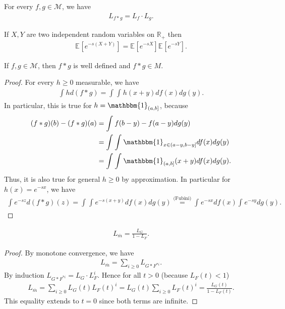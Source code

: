 \begin{prop}[]
	For every $f,g\in \mathcal{M}$, we have
	\begin{align}
		L_{f*g} = L_f \cdot L_g.
	\end{align}
\end{prop}
\begin{rmk}[]
	If $X,Y$ are two independent random variables on $\mathbb{R}_+$ then
	\begin{align}
		\mathbb{E}_{} \left[ e^{-s(X+Y)} \right] =\mathbb{E}_{} \left[ e^{-sX} \right] \mathbb{E}_{} \left[ e^{-sY} \right]. 
	\end{align}
\end{rmk}
\begin{rmk}[]
	If $f,g \in \mathcal{M}$, then $f*g$ is well defined and $f*g \in M$.
\end{rmk}
\begin{proof}
For every $h\geq 0$ measurable, we have
\begin{align}
	\int_{}^{}  h d(f*g) = \int_{}^{} \int_{}^{} h(x+y)df(x) dg(y).
\end{align}
{\color{blue} In particular, this is} true for $h=\mathbbm{1}_{(a,b]} $, because
\begin{align}
	(f*g)(b) - (f*g)(a) &= \int_{}^{} f(b-y) - f(a-y) dg(y) \\
			    &=\int_{}^{} \int_{ }^{} \mathbbm{1}_{x \in (a-y, b-y]} df(x)dg(y) \\
			    &= \int_{}^{} \int_{}^{} \mathbbm{1}_{(a,b]} (x+y) df(x)dg(y).
\end{align}
Thus, it is also true for general $h\geq 0$ by approximation. In particular for $h(x) = e^{-sx}$, we have 
\begin{align}
	\int_{}^{} e^{-sz} d(f*g)(z) = \int_{}^{} \int_{}^{} e^{-s(x+y)} df(x)dg(y) \stackrel{\textrm{(Fubini)}}{=} 
	\int_{}^{} e^{-sx}df(x) \int_{}^{} e^{-sy}dg(y).
\end{align}
\end{proof}

\begin{cor}[]
	\begin{align}
		L_{\overline{m}} = \frac{L_G}{1-L_F}.
	\end{align}
\end{cor}
\begin{proof}
	By monotone convergence, we have
	\begin{align}
		L_{\overline{m}} = \sum_{i\geq 0}^{} L_{G*F^{*i}}.
	\end{align}
	By induction $L_{G*F^{*i}}= L_{G}\cdot L_{F}^i$. Hence for all $t> 0$ (because $L_F(t) <1$) 
	\begin{align}
		L_{\overline{m}} = \sum_{i\geq 0}^{} L_{G}(t) L_{F}(t)^{i} = L_{G}(t) \sum_{i\geq 0}^{} L_{F}(t)^i= \frac{L_G(t)}{1 - L_F(t)}.
	\end{align}
This equality extends to $t=0$ since both terms are infinite.	
\end{proof}

